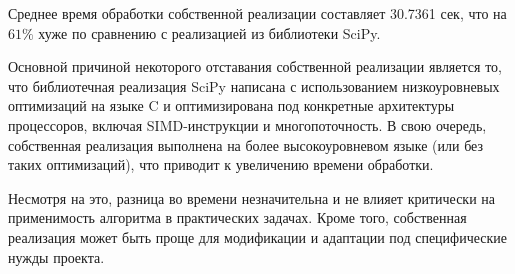 Среднее время обработки собственной реализации составляет 30.7361 сек, что на $61\%$ хуже по сравнению с реализацией из библиотеки SciPy.

Основной причиной некоторого отставания собственной реализации является то, 
что библиотечная реализация SciPy написана с использованием низкоуровневых оптимизаций на языке C 
и оптимизирована под конкретные архитектуры процессоров, включая SIMD-инструкции и многопоточность. 
В свою очередь, собственная реализация выполнена на более высокоуровневом языке (или без таких оптимизаций), 
что приводит к увеличению времени обработки.

Несмотря на это, разница во времени незначительна и не влияет критически на применимость алгоритма в практических задачах. 
Кроме того, собственная реализация может быть проще для модификации и адаптации под специфические нужды проекта.